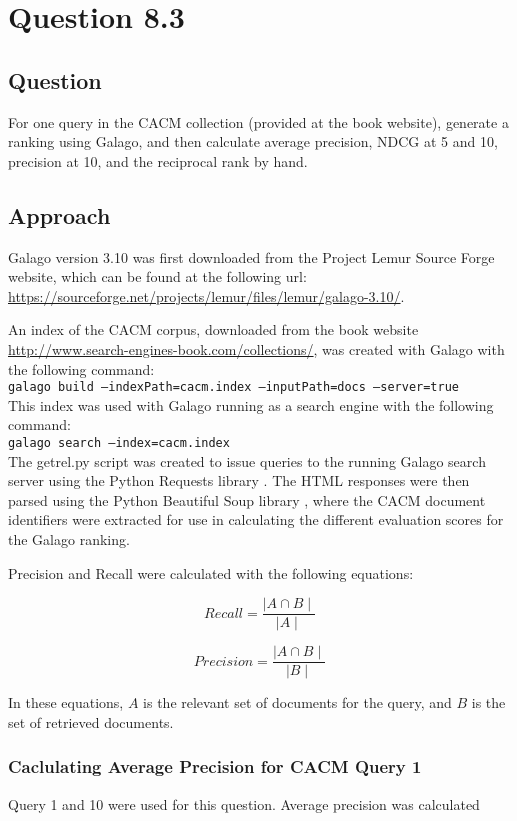 \section{Question 8.3}

\subsection{Question}
For one query in the CACM collection (provided at the book website), generate a ranking using Galago, and then calculate average precision, NDCG at 5 and 10, precision at 10, and the reciprocal rank by hand.

\subsection{Approach}
Galago version 3.10 was first downloaded from the Project Lemur Source Forge website, which can be found at the following url: \url{https://sourceforge.net/projects/lemur/files/lemur/galago-3.10/}.

An index of the CACM corpus, downloaded from the book website \url{http://www.search-engines-book.com/collections/}, was created with Galago with the following command:\\

\texttt{galago build --indexPath=cacm.index --inputPath=docs --server=true}\\

This index was used with Galago running as a search engine with the following command:\\

\texttt{galago search --index=cacm.index}\\

The getrel.py script was created to issue queries to the running Galago search server using the Python Requests library \cite{py:requests}.  The HTML responses were then parsed using the Python Beautiful Soup library \cite{py:soup}, where the CACM document identifiers were extracted for use in calculating the different evaluation scores for the Galago ranking.

Precision and Recall were calculated with the following equations:

\begin{equation}
Recall = \frac{\mid A \cap B \mid}{\mid A \mid}
\end{equation}

\begin{equation}
Precision = \frac{\mid A \cap B \mid}{\mid B \mid}
\end{equation}

In these equations, \(A\) is the relevant set of documents for the query, and \(B\) is the set of retrieved documents.

\subsubsection{Caclulating Average Precision for CACM Query 1}
Query 1 and 10 were used for this question.  Average precision was calculated 